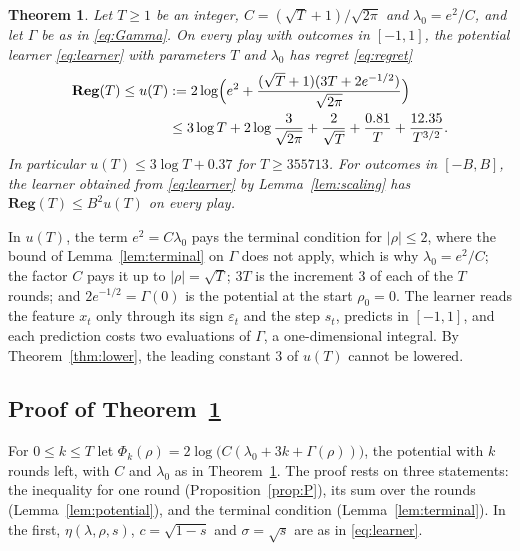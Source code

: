 \documentclass[12pt]{amsart}
\newtheorem{theorem}{Theorem}[section]
\theoremstyle{definition}
\numberwithin{equation}{section}
\newcommand{\Reg}{\mathbf{Reg}}
\newcommand{\leanmap}[1]{\ignorespaces}
\newcommand{\mapnote}[1]{\ignorespaces}
\begin{document}
\begin{theorem}\label{thm:upper}
\leanmap{RegretKappa.UpperSharp.theoremU, RegretKappa.UpperSharp.theoremULog,
  RegretKappa.Corollaries.regret_rescale_learnerU_le, RegretKappa.boundU_le,
  RegretKappa.UpperSharp.ulog_bound, RegretKappa.UpperSharp.const_c_le}
\mapnote{Lean proves the first form for every $T\ge0$ and the second for $T\ge1$, for outcomes in $[-1,1]$ with the learner written out (\lname{RegretKappa.UpperSharp.learnerU}), the case of $[-B,B]$ with the learner of Lemma~\ref{lem:scaling}, and the bound $u(T)\le3\log T+0.37$ as \lname{RegretKappa.boundU_le}. The bounds $4e^{-1/2}/3\le0.81$, $\sqrt T\ge596$ and $2\log(3/\sqrt{2\pi})\le0.366$ of the proof are steps of \lname{RegretKappa.UpperSharp.ulog_bound} and \lname{RegretKappa.boundU_le}, and $2\sqrt{2\pi}\,e^2/3\le12.35$ is \lname{RegretKappa.UpperSharp.const_c_le}.}
Let $T\ge1$ be an integer, $C=(\sqrt T+1)/\sqrt{2\pi}$ and $\lambda_0=e^2/C$, and let $\Gamma$ be as in \eqref{eq:Gamma}. On every play with outcomes in $[-1,1]$, the potential learner \eqref{eq:learner} with parameters $T$ and $\lambda_0$ has regret \eqref{eq:regret}
\begin{align*}
\Reg(T)\le u(T)&:=2\log\Bigl(e^2+\frac{(\sqrt T+1)(3T+2e^{-1/2})}{\sqrt{2\pi}}\Bigr)\\
&\le3\log T+2\log\frac{3}{\sqrt{2\pi}}+\frac{2}{\sqrt T}+\frac{0.81}{T}+\frac{12.35}{T^{3/2}}.
\end{align*}
In particular $u(T)\le3\log T+0.37$ for $T\ge355713$. For outcomes in $[-B,B]$, the learner obtained from \eqref{eq:learner} by Lemma~\ref{lem:scaling} has $\Reg(T)\le B^2u(T)$ on every play.
\end{theorem}

In $u(T)$, the term $e^2=C\lambda_0$ pays the terminal condition for $|\rho|\le2$, where the bound of Lemma~\ref{lem:terminal} on $\Gamma$ does not apply, which is why $\lambda_0=e^2/C$; the factor $C$ pays it up to $|\rho|=\sqrt T$; $3T$ is the increment $3$ of each of the $T$ rounds; and $2e^{-1/2}=\Gamma(0)$ is the potential at the start $\rho_0=0$. The learner reads the feature $x_t$ only through its sign $\varepsilon_t$ and the step $s_t$, predicts in $[-1,1]$, and each prediction costs two evaluations of $\Gamma$, a one-dimensional integral. By Theorem~\ref{thm:lower}, the leading constant $3$ of $u(T)$ cannot be lowered.

\subsection{Proof of Theorem~\ref{thm:upper}}\label{subsec:proofU}
For $0\le k\le T$ let $\Phi_k(\rho)=2\log\bigl(C(\lambda_0+3k+\Gamma(\rho))\bigr)$, the potential with $k$ rounds left, with $C$ and $\lambda_0$ as in Theorem~\ref{thm:upper}. The proof rests on three statements: the inequality for one round (Proposition~\ref{prop:P}), its sum over the rounds (Lemma~\ref{lem:potential}), and the terminal condition (Lemma~\ref{lem:terminal}). In the first, $\eta(\lambda,\rho,s)$, $c=\sqrt{1-s}$ and $\sigma=\sqrt s$ are as in \eqref{eq:learner}.
\end{document}
